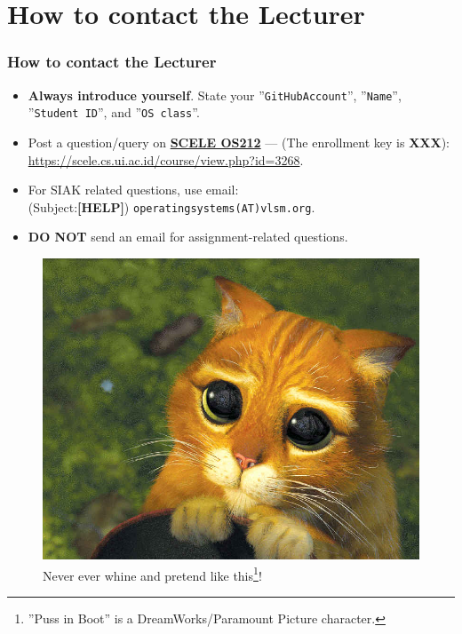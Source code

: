 \documentclass[xcolor=table, notheorems, hyperref={pdfpagelabels=false}]{beamer}
\begin{document}
\section{How to contact the Lecturer}
\begin{frame}[fragile]
\frametitle{How to contact the Lecturer}
\begin{itemize}
\item \textbf{Always introduce yourself}. State your ''\texttt{GitHubAccount}'', ''\texttt{Name}'',
      ''\texttt{Student ID}'', and ''\texttt{OS class}''.
\item Post a question/query on 
\href{https://scele.cs.ui.ac.id/course/view.php?id=3268}{\textbf{SCELE OS212}} ---
(The enrollment key is \textbf{XXX}):
\href{https://scele.cs.ui.ac.id/course/view.php?id=3268}{https://scele.cs.ui.ac.id/course/view.php?id=3268}.
\item For SIAK related questions, use email:\\
(Subject:\textbf{[HELP]}) \texttt{operatingsystems(AT)vlsm.org}. 
\item \textbf{DO NOT} send an email for assignment-related questions.
\end{itemize}

\begin{figure}
\includegraphics[width=0.32\linewidth]{os00-pib}
\caption{Never ever whine and pretend like 
         this\footnote{''Puss in Boot'' is a DreamWorks/Paramount Picture character.}!}
\end{figure}
\end{frame}

\end{document}
